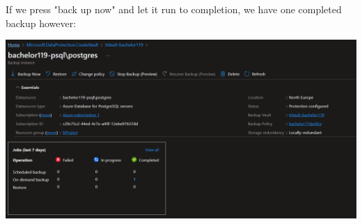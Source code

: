 If we press "back up now" and let it run to completion, we have one completed backup however:

\includegraphics[width=15cm, keepaspectratio]{figures/postgresaasmund/8.PNG}
\label{app_pg_s1e2}
